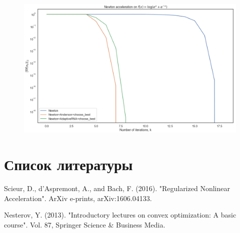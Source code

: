 \documentclass[12pt]{article}
\theoremstyle{definition}
\numberwithin{Def}{section}
\numberwithin{Th}{section}
\numberwithin{Prop}{section}
\numberwithin{St}{section}
\numberwithin{Cor}{section}
\begin{document}
\begin{figure}[H]
  \includegraphics[width=\linewidth]{newton.png}
\end{figure}

\section{Список литературы}

\begin{enumerate}[{[}1{]}]
	\item Scieur, D., d’Aspremont, A., and Bach, F. (2016). "Regularized Nonlinear
	Acceleration". ArXiv e-prints, arXiv:1606.04133.
	\item \label{Nesterov} Nesterov, Y. (2013). "Introductory lectures on convex optimization: A basic course". Vol. 87, Springer Science \& Business Media.
\end{enumerate}
\end{document}
